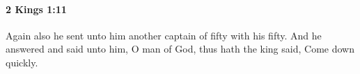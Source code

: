 
		\paragraph{2 Kings 1:11} %
			\label{2KINGS-1-11}

			Again also he sent unto him another captain of fifty with his fifty. And he answered and said unto him, O man of God, thus hath the king said, Come down quickly.


